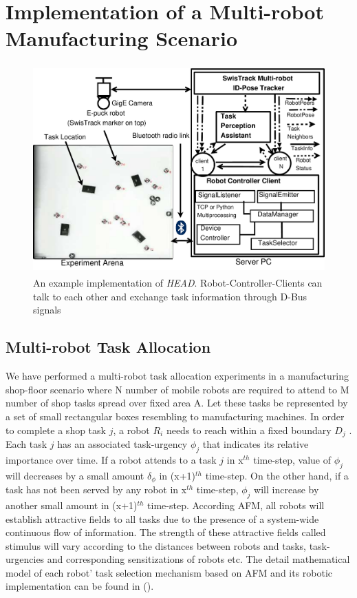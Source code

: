 \documentclass{ifacconf}
\begin{document}
\section{Implementation of a Multi-robot Manufacturing Scenario}
\label{sec:impl}
\begin{figure}
\begin{center}
\includegraphics[width=12cm,height=8cm]{./dia-files/RIL-Expt-Setup3}    %
\caption{An example implementation of {\em HEAD}. Robot-Controller-Clients can talk to each other and exchange task information through D-Bus signals} 
\label{fig:setup}
\end{center}
\end{figure}
\subsection{Multi-robot Task Allocation}
We have performed a multi-robot task allocation experiments in a manufacturing shop-floor scenario where N number of mobile robots are required to attend to M number of shop tasks spread over  fixed area A. Let these tasks be represented by a set of small rectangular boxes resembling to manufacturing machines. In order to complete a shop task $j$, a robot $R_i$ needs to reach within a fixed boundary $D_{j}$ . Each task $j$ has an associated task-urgency $\phi_j$ that indicates its relative importance over time. If a robot attends to a task $j$ in x$^{th}$ time-step, value of $\phi_j$ will decreases by a small amount $\delta_\phi$ in (x+1)$^{th}$ time-step. On the other hand, if a task has not been served by any robot in x$^{th}$ time-step, $\phi_j$ will increase by another small amount in (x+1)$^{th}$ time-step. According AFM, all robots will establish attractive fields to all tasks due to the presence of a system-wide continuous flow of information. The strength of these attractive fields called stimulus will vary according to the distances between robots and tasks, task-urgencies and corresponding sensitizations of robots etc. The detail mathematical model of each robot' task selection mechanism based on AFM and its robotic implementation can be found in (\cite{Arcaute+2008,Sarker+2010ants}).
\end{document}
